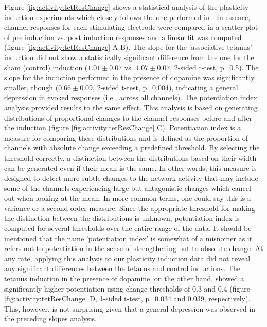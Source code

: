     Figure \ref{fig:activity:tetResChange} shows a statistical analysis of the plasticity induction experiments which closely follows the one performed in \cite{chiappalone2008network}. In essence, channel responses for each stimulating electrode were compared in a scatter plot of pre induction vs. post induction responses and a linear fit was computed (figure \ref{fig:activity:tetResChange} A-B). The slope for the 'associative tetanus' induction did not show a statistically significant difference from the one for the sham (control) induction (\(1.01\pm0.07\) vs. \(1.07\pm0.07\), 2-sided t-test, p=0.5). The slope for the induction performed in the presence of dopamine was significantly smaller, though (\(0.66\pm0.09\), 2-sided t-test, p=0.004), indicating a general depression in evoked responses (i.e., across all channels). The potentiation index analysis provided results to the same effect. This analysis is based on generating distributions of proportional changes to the channel responses before and after the induction (figure \ref{fig:activity:tetResChange} C). Potentiation index is a measure for comparing these distributions and is defined as the proportion of channels with absolute change exceeding a predefined threshold. By selecting the threshold correctly, a distinction between the distributions based on their width can be generated even if their mean is the same. In other words, this measure is designed to detect more subtle changes to the network activity that may include some of the channels experiencing large but antagonistic changes which cancel out when looking at the mean. In more common terms, one could say this is a variance or a second order measure. Since the appropriate threshold for making the distinction between the distributions is unknown, potentiation index is computed for several thresholds over the entire range of the data. It should be mentioned that the name 'potentiation index' is somewhat of a misnomer as it refers not to potentiation in the sense of strengthening but to absolute change. At any rate, applying this analysis to our plasticity induction data did not reveal any significant differences between the tetanus and control inductions. The tetanus induction in the presence of dopamine, on the other hand, showed a significantly higher potentiation using change thresholds of 0.3 and 0.4 (figure \ref{fig:activity:tetResChange} D, 1-sided t-test, p=0.034 and 0.039, respectively). This, however, is not surprising given that a general depression was observed in the preceding slopes analysis.






